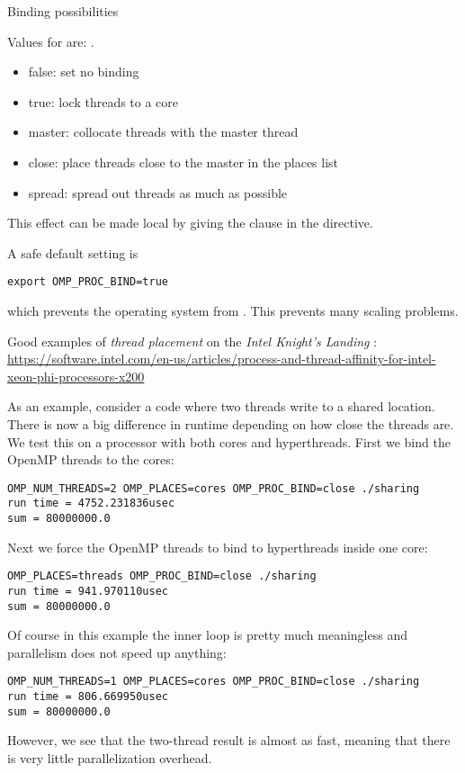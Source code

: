  {Binding possibilities}

Values for  are: .
\begin{itemize}
\item false: set no binding \item true: lock threads to a core \item
  master: collocate threads with the master thread \item close: place
  threads close to the master in the places list \item spread: spread
  out threads as much as possible
\end{itemize}

This effect can be made local by
giving the  clause in the
 directive.

A safe default setting is
\begin{verbatim}
export OMP_PROC_BIND=true
\end{verbatim}
which prevents the operating system from
. This prevents many scaling problems.

Good examples of \emph{thread placement} on the
\emph{Intel Knight's Landing}%
:
\url{https://software.intel.com/en-us/articles/process-and-thread-affinity-for-intel-xeon-phi-processors-x200}

As an example, consider a code where two threads write to a shared
location.
%
%
There is now a big difference in runtime depending on how close the
threads are. We test this on a processor with both cores and
hyperthreads. First we bind the OpenMP threads to the cores:
\begin{verbatim}
OMP_NUM_THREADS=2 OMP_PLACES=cores OMP_PROC_BIND=close ./sharing
run time = 4752.231836usec
sum = 80000000.0
\end{verbatim}
Next we force the OpenMP threads to bind to hyperthreads inside one core:
\begin{verbatim}
OMP_PLACES=threads OMP_PROC_BIND=close ./sharing
run time = 941.970110usec
sum = 80000000.0
\end{verbatim}
Of course in this example the inner loop is pretty much meaningless
and parallelism does not speed up anything:
\begin{verbatim}
OMP_NUM_THREADS=1 OMP_PLACES=cores OMP_PROC_BIND=close ./sharing
run time = 806.669950usec
sum = 80000000.0
\end{verbatim}
However, we see that the two-thread result is almost as fast, meaning
that there is very little parallelization overhead.

